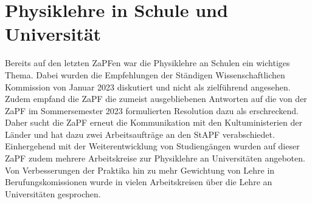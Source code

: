 \documentclass{scrartcl}
\begin{document}
\section*{Physiklehre in Schule und Universität}
Bereits auf den letzten ZaPFen war die Physiklehre an Schulen ein wichtiges Thema. Dabei wurden die Empfehlungen der Ständigen Wissenschaftlichen Kommission von Januar 2023 diskutiert und nicht als zielführend angesehen. Zudem empfand die ZaPF die zumeist ausgebliebenen Antworten auf die von der ZaPF im Sommersemester 2023 formulierten Resolution dazu als erschreckend. Daher sucht die ZaPF erneut die Kommunikation mit den Kultuministerien der Länder und hat dazu zwei Arbeitsaufträge an den StAPF verabschiedet. Einhergehend mit der Weiterentwicklung von Studiengängen wurden auf dieser ZaPF zudem mehrere Arbeitskreise zur Physiklehre an Universitäten angeboten.
Von Verbesserungen der Praktika hin zu mehr Gewichtung von Lehre in Berufungskomissionen wurde in vielen Arbeitskreisen über die Lehre an Universitäten gesprochen.
\end{document}
